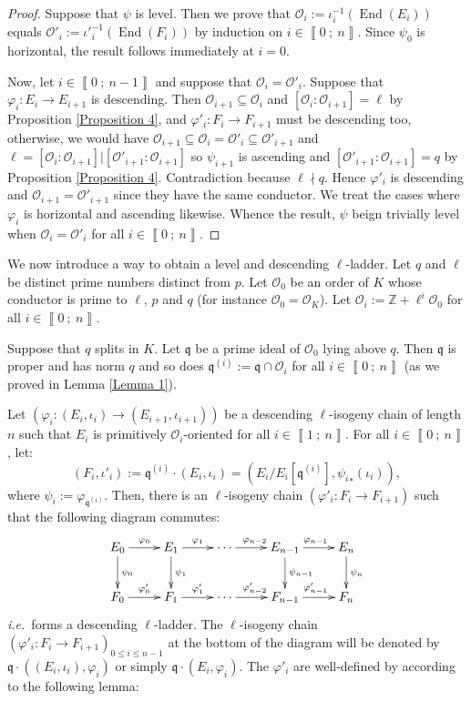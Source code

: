 \documentclass[a4paper,10pt,notitlepage]{report}
\theoremstyle{definition}
\theoremstyle{plain}
\theoremstyle{definition}
\newcommand{\ie}{\emph{i.e.}\ }
\newcommand{\Z}{\mathbb{Z}}
\newcommand{\mO}{\mathcal{O}}
\renewcommand{\i}[2]{\left\llbracket #1~;~#2\right\rrbracket}
\renewcommand{\(}{\left(}
\renewcommand{\)}{\right)}
\newcommand{\mf}[1]{\mathfrak{#1}}
\newcommand{\mfq}{\mathfrak{q}}
\DeclareMathOperator{\End}{End}
\begin{document}
\begin{proof}
Suppose that $\psi$ is level. Then we prove that $\mO_i:=\iota_i^{-1}(\End(E_i))$ equals $\mO'_i:={\iota'}_i^{-1}(\End(F_i))$ by induction on $i\in\i{0}{n}$. Since $\psi_0$ is horizontal, the result follows immediately at $i=0$. 

Now, let $i\in\i{0}{n-1}$ and suppose that $\mO_i=\mO'_i$. Suppose that $\varphi_i : E_i\longrightarrow E_{i+1}$ is descending. Then $\mO_{i+1}\subseteq\mO_i$ and $[\mO_i:\mO_{i+1}]=\ell$ by Proposition \ref{Proposition 4}, and $\varphi'_i: F_i\longrightarrow F_{i+1}$ must be descending too, otherwise, we would have $\mO_{i+1}\subseteq\mO_i=\mO'_i\subseteq \mO'_{i+1}$ and $\ell=[\mO_i:\mO_{i+1}]|[\mO'_{i+1}:\mO_{i+1}]$ so $\psi_{i+1}$ is ascending and $[\mO'_{i+1}:\mO_{i+1}]=q$ by Proposition \ref{Proposition 4}. Contradiction because $\ell\nmid q$.  Hence $\varphi'_i$ is descending and $\mO_{i+1}=\mO'_{i+1}$ since they have the same conductor. We treat the cases where $\varphi_i$ is horizontal and ascending likewise. Whence the result, $\psi$ beign trivially level when $\mO_i=\mO'_i$ for all $i\in\i{0}{n}$.
\end{proof}

We now introduce a way to obtain a level and descending $\ell$-ladder. Let $q$ and $\ell$ be distinct prime numbers distinct from $p$. Let $\mO_0$ be an order of $K$ whose conductor is prime to $\ell$,  $p$ and $q$ (for instance $\mO_0=\mO_K$).  Let $\mO_i:=\Z+\ell^i\mO_0$ for all $i\in\i{0}{n}$.

Suppose that $q$ splits in $K$. Let $\mfq$ be a prime ideal of $\mO_0$ lying above $q$. Then $\mfq$ is proper and has norm $q$ and so does $\mfq^{(i)}:=\mfq\cap\mO_i$ for all $i\in\i{0}{n}$ (as we proved in Lemma \ref{Lemma 1}).

Let $(\varphi_i: (E_i,\iota_i)\longrightarrow (E_{i+1},\iota_{i+1}))$ be a descending $\ell$-isogeny chain of length $n$ such that $E_i$ is primitively $\mO_i$-oriented for all $i\in\i{1}{n}$. For all $i\in\i{0}{n}$, let:
\[(F_i,\iota'_i):=\mfq^{(i)}\cdot(E_i,\iota_i)=(E_i/E_i[\mfq^{(i)}],{\psi_i}_*(\iota_i)),\]
where $\psi_i:=\varphi_{\mfq^{(i)}}$. Then, there is an $\ell$-isogeny chain $(\varphi'_i:F_i\longrightarrow F_{i+1})$ such that the following diagram commutes:
\[\xymatrix{
E_0 \ar[d]^{\psi_0} \ar[r]^{\varphi_0} & E_1\ar[d]^{\psi_1} \ar[r]^{\varphi_{1}}& \cdots \ar[r]^{\varphi_{n-2}} & E_{n-1} \ar[d]^{\psi_{n-1}} \ar[r]^{\varphi_{n-1}} & E_n \ar[d]^{\psi_n}\\
F_0 \ar[r]^{\varphi'_0} & F_1 \ar[r]^{\varphi'_{1}}& \cdots \ar[r]^{\varphi'_{n-2}} & F_{n-1} \ar[r]^{\varphi'_{n-1}} & F_n
}\]
\ie forms a descending $\ell$-ladder.  The $\ell$-isogeny chain $(\varphi'_i:F_i\longrightarrow F_{i+1})_{0\leq i\leq n-1}$ at the bottom of the diagram will be denoted by $\mf{q}\cdot((E_i,\iota_i),\varphi_i)$ or simply $\mf{q}\cdot(E_i,\varphi_i)$.  The $\varphi'_i$ are well-defined by \cite[corollary III.4.11]{Silverman1} according to the following lemma:
\end{document}
